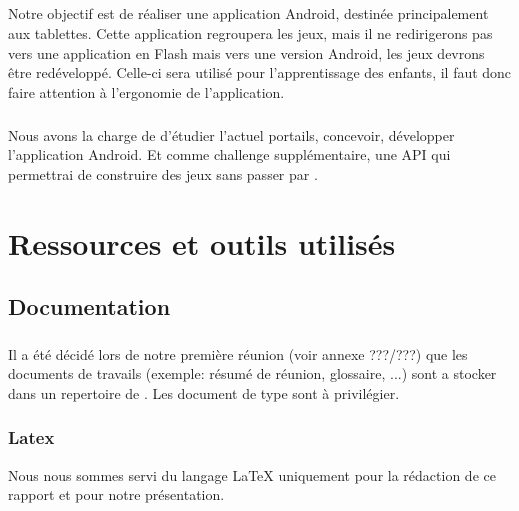 \documentclass[french]{report}
\begin{document}
\paragraph{}Notre objectif est de réaliser une application Android, destinée principalement aux tablettes. Cette application regroupera les jeux, mais il ne redirigerons pas vers une application en Flash mais vers une version Android, les jeux devrons \^{e}tre redéveloppé. Celle-ci sera utilisé pour l'apprentissage des enfants, il faut donc faire attention à l'ergonomie de l'application.
\paragraph{}Nous avons la charge de d'étudier l'actuel portails, concevoir, développer l'application Android. Et comme challenge supplémentaire, une API qui permettrai de construire des jeux sans passer par \java{}.


\chapter{Ressources et outils utilisés}
\section{Documentation}
\subsection{\googleDrive}
Il a été décidé lors de notre première réunion (voir annexe ???/???) que les documents de travails (exemple: résumé de réunion, glossaire, ...) sont a stocker dans un repertoire de \googleDrive{}. Les document de type \og{}\google{}\fg{} sont à privilégier.
\subsection{Latex}
Nous nous sommes servi du langage \LaTeX{} uniquement pour la rédaction de ce rapport et pour notre présentation.
\end{document}

